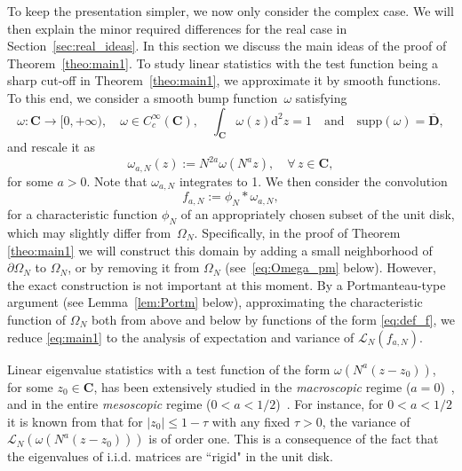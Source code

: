 \documentclass[10pt]{amsart}
\numberwithin{equation}{section}
\newcommand{\dif}{\mathrm{d}}
\newcommand{\C}{\mathbf{C}}
\newcommand{\Lin}{\mathcal{L}}
\begin{document}
To keep the presentation simpler, we now only consider the complex case. We will then explain the minor required differences for the real case in Section~\ref{sec:real_ideas}. In this section we discuss the main ideas of the proof of Theorem~\ref{theo:main1}. To study linear statistics with the test function being a sharp cut-off in Theorem~\ref{theo:main1}, we approximate it by smooth functions. To this end, we consider a smooth bump function~$\omega$ satisfying
\begin{equation}
\omega:\C\to [0,+\infty),\quad \omega\in C_c^\infty(\C),\quad  \int_\C \omega(z)\dif^2 z=1\quad\text{and}\quad \mathrm{supp}(\omega)=\overline{\mathbf{D}},
\label{eq:omega_conditions}
\end{equation}
and rescale it as
\begin{equation*}
\omega_{a,N}(z):=N^{2a}\omega(N^az),\quad \forall \, z\in \C,
\end{equation*} 
for some $a>0$. Note that $\omega_{a,N}$ integrates to 1. We then consider the convolution
\begin{equation}
f_{a,N}:=\phi_N*\omega_{a,N},
\label{eq:def_f}
\end{equation}
for a characteristic function $\phi_N$ of an appropriately chosen subset of the unit disk, which may slightly differ from~$\Omega_N$. Specifically, in the proof of Theorem \ref{theo:main1} we will construct this domain by adding a small neighborhood of $\partial\Omega_N$ to $\Omega_N$, or by removing it from $\Omega_N$ (see~\eqref{eq:Omega_pm} below). However, the exact construction is not important at this moment. By a Portmanteau-type argument (see Lemma~\ref{lem:Portm} below), approximating the characteristic function of $\Omega_N$ both from above and below by functions of the form \eqref{eq:def_f}, we reduce \eqref{eq:main1} to the analysis of expectation and variance of $\Lin_N(f_{a,N})$.

Linear eigenvalue statistics with a test function of the form $\omega(N^a(z-z_0))$, for some $z_0\in\C$, has been extensively studied in the \emph{macroscopic} regime ($a=0$)~\cite{macroCLT_complex,macroCLT_real}, and in the entire \emph{mesoscopic} regime ($0<a<1/2$)~\cite{Cipolloni_meso}. For instance, for $0<a<1/2$ it is known from \cite[Theorem~2.1]{Cipolloni_meso} that for $|z_0|\le 1-\tau$ with any fixed $\tau>0$, the variance of $\Lin_N(\omega(N^a(z-z_0)))$ is of order one. This is a consequence of the fact that the eigenvalues of i.i.d. matrices are “rigid" in the unit disk.
\end{document}
